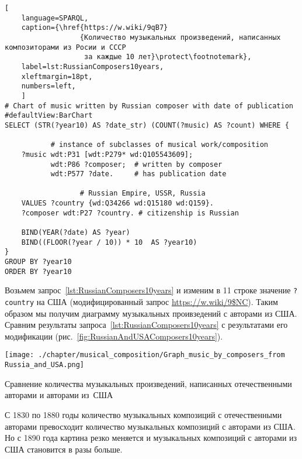 \begin{lstlisting}[ 
    language=SPARQL,
    caption={\href{https://w.wiki/9qB7}
                  {Количество музыкальных произведений, написанных композиторами из Росии и СССР 
                   за каждые 10 лет}\protect\footnotemark},
    label=lst:RussianComposers10years,
    xleftmargin=18pt,
    numbers=left,
    ]
# Chart of music written by Russian composer with date of publication
#defaultView:BarChart
SELECT (STR(?year10) AS ?date_str) (COUNT(?music) AS ?count) WHERE {
    
           # instance of subclasses of musical work/composition
    ?music wdt:P31 [wdt:P279* wd:Q105543609];
           wdt:P86 ?composer;  # written by composer
           wdt:P577 ?date.     # has publication date
    
                  # Russian Empire, USSR, Russia
    VALUES ?country {wd:Q34266 wd:Q15180 wd:Q159}.
    ?composer wdt:P27 ?country. # citizenship is Russian
  
    BIND(YEAR(?date) AS ?year)
    BIND((FLOOR(?year / 10)) * 10  AS ?year10)
}
GROUP BY ?year10
ORDER BY ?year10
\end{lstlisting}%
 
Возьмем запрос~\ref{lst:RussianComposers10years} и изменим в 11 строке значение \lstinline|?country| 
на США (модифицированный запрос \href{https://w.wiki/9$NC}{https://w.wiki/9\$NC}). 
Таким образом мы получим диаграмму музыкальных проивзедений с авторами из США. 
Сравним результаты запроса~\ref{lst:RussianComposers10years} с результатами его модификации (рис.~\ref{fig:RussianAndUSAComposers10years}).

\begin{marginfigure}[0\baselineskip]
	\texttt{[image: ./chapter/musical\_composition/Graph\_music\_by\_composers\_from Russia\_and\_USA.png]}
	\caption{Сравнение количества музыкальных произведений, написанных отечественными авторами и авторами из~США}%
	\label{fig:RussianAndUSAComposers10years}%
\end{marginfigure}

С 1830 по 1880 годы количество музыкальных композиций с отечественными авторами превосходит 
количество музыкальных композиций с авторами из США. Но с 1890 года картина резко меняется и 
музыкальных композиций с авторами из США становится в разы больше.


